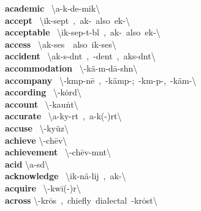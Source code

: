 \documentclass[10pt,a4paper]{article}
\begin{document}
\begin{multicols}{2}
\textbf{ academic }\quad \ \textbackslash \textsecstress a-k\textschwa -\textprimstress de-mik\textbackslash \\
\textbf{ accept }\quad \ \textbackslash ik-\textprimstress sept\ ,\ ak-\ also\ ek-\textbackslash \\
\textbf{ acceptable }\quad \ \textbackslash ik-\textprimstress sep-t\textschwa -b\textschwa l\ ,\ ak-\ also\ ek-\textbackslash \\
\textbf{ access }\quad \ \textbackslash \textprimstress ak-\textsecstress ses\ \ also\ ik-\textprimstress ses\textbackslash \\
\textbf{ accident }\quad \ \textbackslash \textprimstress ak-s\textschwa -d\textschwa nt\ ,\ -\textsecstress dent\ ,\ \textprimstress aks-d\textschwa nt\textbackslash \\
\textbf{ accommodation }\quad \ \textbackslash \textschwa -\textsecstress k\"{a}-m\textschwa -\textprimstress d\={a}-sh\textschwa n\textbackslash \\
\textbf{ accompany }\quad \ \textbackslash \textschwa -\textprimstress k\textschwa mp-n\={e}\ ,\ -\textprimstress k\"{a}mp-;\ -\textprimstress k\textschwa m-p\textschwa -,\ -\textprimstress k\"{a}m-\textbackslash \\
\textbf{ according }\quad \ \textbackslash \textschwa -\textprimstress k\.{o}rd\textbackslash \\
\textbf{ account }\quad \ \textbackslash \textschwa -\textprimstress kau\. nt\textbackslash \\
\textbf{ accurate }\quad \ \textbackslash \textprimstress a-ky\textschwa -r\textschwa t\ ,\ \textprimstress a-k(\textschwa -)r\textschwa t\textbackslash \\
\textbf{ accuse }\quad \ \textbackslash \textschwa -\textprimstress ky\"{u}z\textbackslash \\
\textbf{ achieve }\quad \textbackslash \textschwa -\textprimstress ch\={e}v\textbackslash \\
\textbf{ achievement }\quad \ \textbackslash \textschwa -\textprimstress ch\={e}v-m\textschwa nt\textbackslash \\
\textbf{ acid }\quad \textbackslash \textprimstress a-s\textschwa d\textbackslash \\
\textbf{ acknowledge }\quad \ \textbackslash ik-\textprimstress n\"{a}-lij\ ,\ ak-\textbackslash \\
\textbf{ acquire }\quad \ \textbackslash \textschwa -\textprimstress kw\={i}(-\textschwa )r\textbackslash \\
\textbf{ across }\quad \textbackslash \textschwa -\textprimstress kr\.{o}s\ ,\ chiefly\ dialectal\ -\textprimstress kr\.{o}st\textbackslash \\

\end{multicols}
\end{document}
